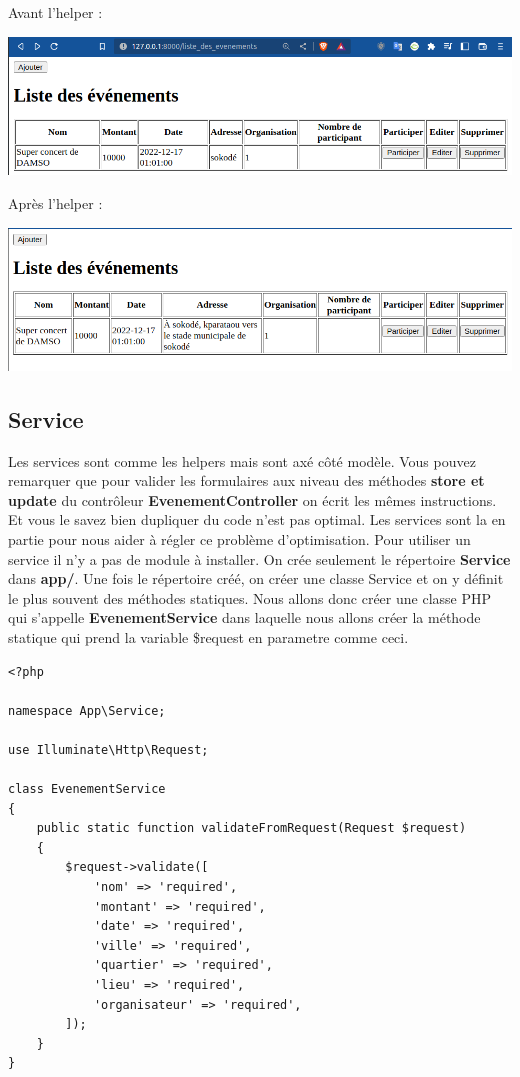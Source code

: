 \documentclass[12pt,a4paper]{article}
\begin{document}
Avant l'helper :
\begin{center}
\includegraphics[scale=0.5]{img/evenement_before_helper.png}
\end{center}
Après l'helper :
\begin{center}
\includegraphics[scale=0.5]{img/evenement_after_helper.png}
\end{center}

\subsection{Service}

Les services sont comme les helpers mais sont axé côté modèle.
Vous pouvez remarquer que pour valider les formulaires aux niveau des méthodes \textbf{store et update}
du contrôleur \textbf{EvenementController} on écrit les mêmes instructions. Et vous le savez bien dupliquer du code n'est pas optimal. Les services sont la en partie pour nous aider à régler ce problème d'optimisation.
Pour utiliser un service il n'y a pas de module à installer. On crée seulement le répertoire \textbf{Service} dans \textbf{app/}. Une fois le répertoire créé, on créer une classe Service et on
y définit le plus souvent des méthodes statiques. Nous allons donc créer une classe PHP qui s'appelle
\textbf{EvenementService} dans laquelle nous allons créer la méthode statique \textbf{} qui prend la variable \$request en parametre comme ceci.

\newpage

\begin{verbatim}
<?php

namespace App\Service;

use Illuminate\Http\Request;

class EvenementService
{
    public static function validateFromRequest(Request $request)
    {
        $request->validate([
            'nom' => 'required',
            'montant' => 'required',
            'date' => 'required',
            'ville' => 'required',
            'quartier' => 'required',
            'lieu' => 'required',
            'organisateur' => 'required',
        ]);
    }
}
\end{verbatim}
\end{document}
